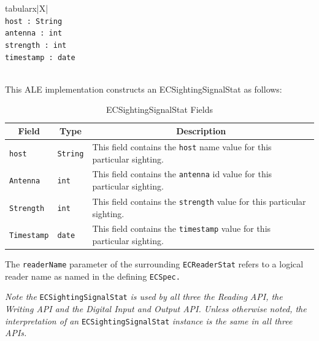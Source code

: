 \documentclass[11pt,a4paper,oneside]{article}
\newenvironment{code}%
   {\snugshade\begin{internallinenumbers}}%
   {\end{internallinenumbers}\endsnugshade}
\newenvironment{code}
    {\HCode{<div class='code'><p>}}
    {\HCode{</p></div>}}
\newenvironment{bbox}%
{\begin{table}[h!]\begin{threeparttable}}%
{\end{threeparttable}\end{table}\FloatBarrier}
\newenvironment{bbox}
{\ifvmode\IgnorePar\fi \EndP\Tg<div class='bbox'>}{\Tg</div>\IgnoreIndent}
\begin{document}
\begin{bbox}
\begin{edtable}{tabularx}{\linewidth}{|X|}
\hline 
{}
\\
\texttt{host : String }\\
\texttt{antenna : int}\\
\texttt{strength : int}\\
\texttt{timestamp : date}\\
\texttt{\textendash \textendash \textendash}\\
\hline
\end{edtable}
\end{bbox}

This ALE implementation constructs an ECSightingSignalStat as follows:

\begin{table}[!h]
\begin{tabularx}{\textwidth}{|l|X|X|}
\hline
\multicolumn{1}{|c|}{\textbf{Field}}&
\multicolumn{1}{c|}{\textbf{Type}}&
\multicolumn{1}{c|}{\textbf{Description}}\\
\hline
\texttt{host}&\texttt{String}&This field contains the \texttt{host} name value for this particular sighting.\\
\hline
\texttt{Antenna}&\texttt{int}&This field contains the \texttt{antenna} id value for this particular sighting.\\
\hline
\texttt{Strength}&\texttt{int}&This field contains the \texttt{strength} value for this particular sighting.\\
\hline
\texttt{Timestamp}&\texttt{date}&This field contains the \texttt{timestamp} value for this particular sighting.\\
\hline
\end {tabularx}
\caption{ECSightingSignalStat Fields}
\MakeLineNo
\end{table}
\FloatBarrier

The \texttt{readerName} parameter of the surrounding \texttt{ECReaderStat} refers to a logical reader name as named in the defining \texttt{ECSpec.}


\begin {code}
\emph{Note the} \texttt{ECSightingSignalStat} \emph{is used by all three the Reading API, the Writing API and the Digital Input and Output API. Unless otherwise noted, the interpretation of an} \texttt{ECSightingSignalStat} \emph{instance is the same in all three APIs.}
\end{code}
\end{document}
